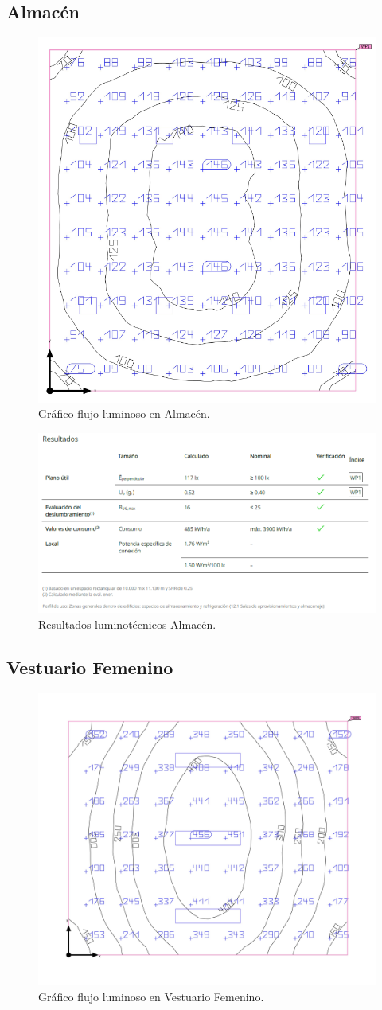 \documentclass[../main.tex]{subfiles}
\begin{document}
\subsection{Almacén}
\begin{figure}[H]
    \centering
    \includegraphics[width=0.5\linewidth]{Imagenes/Iluminacion Almacen.png}
    \caption{Gráfico flujo luminoso en Almacén.}
\end{figure}

\begin{figure}[H]
    \centering
    \includegraphics[width=0.75\linewidth]{Imagenes/Resultados Iluminacion Almacen.png}
    \caption{Resultados luminotécnicos Almacén.}
\end{figure}

\subsection{Vestuario Femenino}
\begin{figure}[H]
    \centering
    \includegraphics[width=0.5\linewidth]{Imagenes/Iluminacion Vestuario Femenino.png}
    \caption{Gráfico flujo luminoso en Vestuario Femenino.}
\end{figure}
\end{document}
